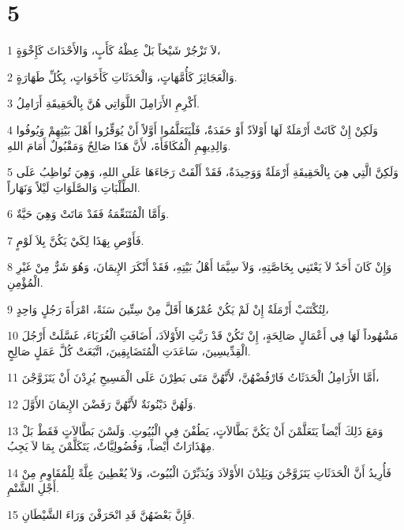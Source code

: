 \chapter{5}

\par 1 لاَ تَزْجُرْ شَيْخاً بَلْ عِظْهُ كَأَبٍ، وَالأَحْدَاثَ كَإِخْوَةٍ،
\par 2 وَالْعَجَائِزَ كَأُمَّهَاتٍ، وَالْحَدَثَاتِ كَأَخَوَاتٍ، بِكُلِّ طَهَارَةٍ.
\par 3 أَكْرِمِ الأَرَامِلَ اللَّوَاتِي هُنَّ بِالْحَقِيقَةِ أَرَامِلُ.
\par 4 وَلَكِنْ إِنْ كَانَتْ أَرْمَلَةٌ لَهَا أَوْلاَدٌ أَوْ حَفَدَةٌ، فَلْيَتَعَلَّمُوا أَوَّلاً أَنْ يُوَقِّرُوا أَهْلَ بَيْتِهِمْ وَيُوفُوا وَالِدِيهِمِ الْمُكَافَأَةَ، لأَنَّ هَذَا صَالِحٌ وَمَقْبُولٌ أَمَامَ اللهِ.
\par 5 وَلَكِنَّ الَّتِي هِيَ بِالْحَقِيقَةِ أَرْمَلَةٌ وَوَحِيدَةٌ، فَقَدْ أَلْقَتْ رَجَاءَهَا عَلَى اللهِ، وَهِيَ تُواظِبُ عَلَى الطِّلْبَاتِ وَالصَّلَوَاتِ لَيْلاً وَنَهَاراً.
\par 6 وَأَمَّا الْمُتَنَعِّمَةُ فَقَدْ مَاتَتْ وَهِيَ حَيَّةٌ.
\par 7 فَأَوْصِ بِهَذَا لِكَيْ يَكُنَّ بِلاَ لَوْمٍ.
\par 8 وَإِنْ كَانَ أَحَدٌ لاَ يَعْتَنِي بِخَاصَّتِهِ، وَلاَ سِيَّمَا أَهْلُ بَيْتِهِ، فَقَدْ أَنْكَرَ الإِيمَانَ، وَهُوَ شَرٌّ مِنْ غَيْرِ الْمُؤْمِنِ.
\par 9 لِتُكْتَتَبْ أَرْمَلَةٌ إِنْ لَمْ يَكُنْ عُمْرُهَا أَقَلَّ مِنْ سِتِّينَ سَنَةً، امْرَأَةَ رَجُلٍ وَاحِدٍ،
\par 10 مَشْهُوداً لَهَا فِي أَعْمَالٍ صَالِحَةٍ، إِنْ تَكُنْ قَدْ رَبَّتِ الأَوْلاَدَ، أَضَافَتِ الْغُرَبَاءَ، غَسَّلَتْ أَرْجُلَ الْقِدِّيسِينَ، سَاعَدَتِ الْمُتَضَايِقِينَ، اتَّبَعَتْ كُلَّ عَمَلٍ صَالِحٍ.
\par 11 أَمَّا الأَرَامِلُ الْحَدَثَاتُ فَارْفُضْهُنَّ، لأَنَّهُنَّ مَتَى بَطِرْنَ عَلَى الْمَسِيحِ يُرِدْنَ أَنْ يَتَزَوَّجْنَ،
\par 12 وَلَهُنَّ دَيْنُونَةٌ لأَنَّهُنَّ رَفَضْنَ الإِيمَانَ الأَوَّلَ.
\par 13 وَمَعَ ذَلِكَ أَيْضاً يَتَعَلَّمْنَ أَنْ يَكُنَّ بَطَّالاَتٍ، يَطُفْنَ فِي الْبُيُوتِ. وَلَسْنَ بَطَّالاَتٍ فَقَطْ بَلْ مِهْذَارَاتٌ أَيْضاً، وَفُضُولِيَّاتٌ، يَتَكَلَّمْنَ بِمَا لاَ يَجِبُ.
\par 14 فَأُرِيدُ أَنَّ الْحَدَثَاتِ يَتَزَوَّجْنَ وَيَلِدْنَ الأَوْلاَدَ وَيُدَبِّرْنَ الْبُيُوتَ، وَلاَ يُعْطِينَ عِلَّةً لِلْمُقَاوِمِ مِنْ أَجْلِ الشَّتْمِ.
\par 15 فَإِنَّ بَعْضَهُنَّ قَدِ انْحَرَفْنَ وَرَاءَ الشَّيْطَانِ.
